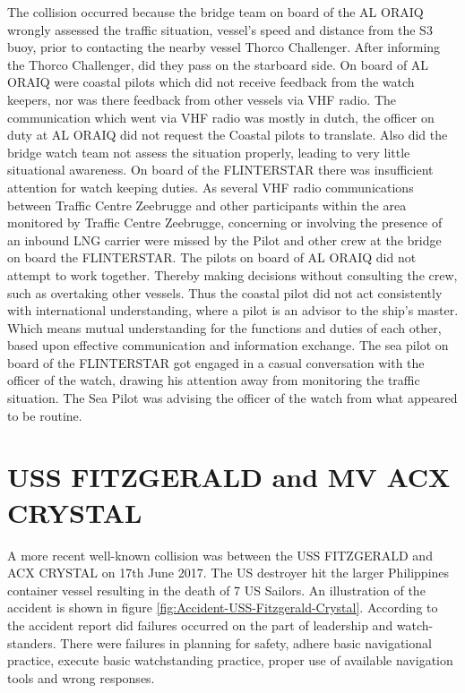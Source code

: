 The collision occurred because the bridge team on board of the AL ORAIQ wrongly assessed the traffic situation, vessel's speed and distance from the S3 buoy, prior to contacting the nearby vessel Thorco Challenger. After informing the Thorco Challenger, did they pass on the starboard side. On board of AL ORAIQ were coastal pilots which did not receive feedback from the watch keepers, nor was there feedback from other vessels via \ac{VHF} radio. The communication which went via VHF radio was mostly in dutch, the officer on duty at AL ORAIQ did not request the Coastal pilots to translate. Also did the bridge watch team not assess the situation properly, leading to very little situational awareness.
On board of the FLINTERSTAR there was insufficient attention for watch keeping duties. As several VHF radio communications between Traffic Centre Zeebrugge and other participants within the area monitored by Traffic Centre Zeebrugge, concerning or involving the presence of an inbound LNG carrier were missed by the Pilot and other crew at the bridge on board the FLINTERSTAR.
The pilots on board of AL ORAIQ did not attempt to work together. Thereby making decisions without consulting the crew, such as overtaking other vessels. Thus the coastal pilot did not act consistently with international understanding, where a pilot is an advisor to the ship's master. Which means mutual understanding for the functions and duties of each other, based upon effective communication and information exchange. 
The sea pilot on board of the FLINTERSTAR got engaged in a casual conversation with the officer of the watch, drawing his attention away from monitoring the traffic situation. The Sea Pilot was advising the officer of the watch from what appeared to be routine. \cite{Backer2015}

\newpage
\section{USS FITZGERALD and MV ACX CRYSTAL}
A more recent well-known collision was between the USS FITZGERALD and ACX CRYSTAL on 17th June 2017. The US destroyer hit the larger Philippines container vessel resulting in the death of 7 US Sailors. An illustration of the accident is shown in figure \ref{fig:Accident-USS-Fitzgerald-Crystal}. According to the accident report did failures occurred on the part of leadership and watch-standers. There were failures in planning for safety, adhere basic navigational practice, execute basic watchstanding practice, proper use of available navigation tools and wrong responses.


